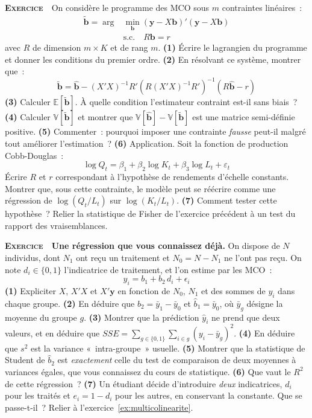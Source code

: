 \documentclass[10pt,a4paper,notitlepage]{article}
\newcounter{xnumber}
\newcommand{\exercice}{\refstepcounter{xnumber}\textsc{\textbf{Exercice}} \textbf{\thexnumber}\,\,}
\newcommand{\question}[1]{\textbf{(#1)}}
\begin{document}
\bigskip

\exercice\label{ex:contraintes} On considère le programme des MCO sous $m$ contraintes linéaires~:
\[
  \begin{split}
    \tilde{\mathbf b} = \arg & \min_{\mathbf b} (\mathbf{y}-X\mathbf{b})'(\mathbf{y}-X\mathbf{b})\\
                             &\text{s.c.} \quad R\mathbf{b} = r
  \end{split}
\]
avec $R$ de dimension $m\times K$ et de rang $m$. \question{1} Écrire le
lagrangien du programme et donner les conditions du premier ordre. \question{2}
En résolvant ce système, montrer que~:
\[
  \tilde{\mathbf b} = \hat{\mathbf b} - (X'X)^{-1}R'\left(R(X'X)^{-1}R'\right)^{-1}\left(R\hat{\mathbf b}-r\right)
\]
\question{3} Calculer $\mathbb E[\tilde{\mathbf b}]$. À quelle condition
l'estimateur contraint est-il sans biais~? \question{4} Calculer
$\mathbb V[\tilde{\mathbf b}]$ et montrer que
$\mathbb V[\hat{\mathbf b}]-\mathbb V[\tilde{\mathbf b}]$ est une matrice
semi-définie positive. \question{5} Commenter~: pourquoi imposer une contrainte
\emph{fausse} peut-il malgré tout améliorer l'estimation~? \question{6}
Application. Soit la fonction de production Cobb-Douglas~:
\[
  \log Q_t = \beta_1 + \beta_2 \log K_t + \beta_3 \log L_t + \varepsilon_t
\]
Écrire $R$ et $r$ correspondant à l'hypothèse de rendements d'échelle
constants. Montrer que, sous cette contrainte, le modèle peut se réécrire comme
une régression de $\log (Q_t/L_t)$ sur $\log (K_t/L_t)$. \question{7} Comment
tester cette hypothèse~? Relier la statistique de Fisher de l'exercice précédent
à un test du rapport des vraisemblances.\newline

\bigskip
\exercice\label{ex:indicatrice} \textbf{Une régression que vous connaissez déjà.}
On dispose de $N$ individus, dont $N_1$ ont reçu un traitement et $N_0 = N-N_1$
ne l'ont pas reçu. On note $d_i\in\{0,1\}$ l'indicatrice de traitement, et l'on
estime par les MCO~:
\[
  y_i = b_1 + b_2\,d_i + \epsilon_i
\]
\question{1} Expliciter $X$, $X'X$ et $X'\mathbf y$ en fonction de $N_0$, $N_1$
et des sommes de $y_i$ dans chaque groupe. \question{2} En déduire que
$\hat b_2 = \bar y_1 - \bar y_0$ et $\hat b_1 = \bar y_0$, où $\bar y_g$ désigne
la moyenne du groupe $g$. \question{3} Montrer que la prédiction
$\hat y_i$ ne prend que deux valeurs, et en déduire que
$SSE = \sum_{g\in\{0,1\}}\sum_{i\in g}\left(y_i-\bar y_g\right)^2$.
\question{4} En déduire que $s^2$ est la variance «~intra-groupe~» usuelle.
\question{5} Montrer que la statistique de Student de $\hat b_2$ est
\emph{exactement} celle du test de comparaison de deux moyennes à variances
égales, que vous connaissez du cours de statistique. \question{6} Que vaut le
$R^2$ de cette régression~? \question{7} Un étudiant décide d'introduire
\emph{deux} indicatrices, $d_i$ pour les traités et $e_i = 1-d_i$ pour les
autres, en conservant la constante. Que se passe-t-il~? Relier à
l'exercice~\ref{ex:multicolinearite}.\newline
\end{document}
